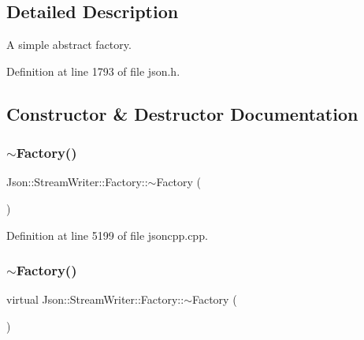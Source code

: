 \subsection{Detailed Description}
A simple abstract factory. 

Definition at line 1793 of file json.\+h.



\subsection{Constructor \& Destructor Documentation}
\hypertarget{class_json_1_1_stream_writer_1_1_factory_ad334ad5e81e3b9b1768620a446366ff1}{}\label{class_json_1_1_stream_writer_1_1_factory_ad334ad5e81e3b9b1768620a446366ff1} 
\subsubsection{\texorpdfstring{$\sim$\+Factory()}{~Factory()}\hspace{0.1cm}{\footnotesize\ttfamily [1/2]}}
{\footnotesize\ttfamily Json\+::\+Stream\+Writer\+::\+Factory\+::$\sim$\+Factory (\begin{DoxyParamCaption}{ }\end{DoxyParamCaption})\hspace{0.3cm}{\ttfamily [virtual]}}



Definition at line 5199 of file jsoncpp.\+cpp.

\hypertarget{class_json_1_1_stream_writer_1_1_factory_a9f886907e7de963285731420f98890e4}{}\label{class_json_1_1_stream_writer_1_1_factory_a9f886907e7de963285731420f98890e4} 
\subsubsection{\texorpdfstring{$\sim$\+Factory()}{~Factory()}\hspace{0.1cm}{\footnotesize\ttfamily [2/2]}}
{\footnotesize\ttfamily virtual Json\+::\+Stream\+Writer\+::\+Factory\+::$\sim$\+Factory (\begin{DoxyParamCaption}{ }\end{DoxyParamCaption})\hspace{0.3cm}{\ttfamily [virtual]}}



